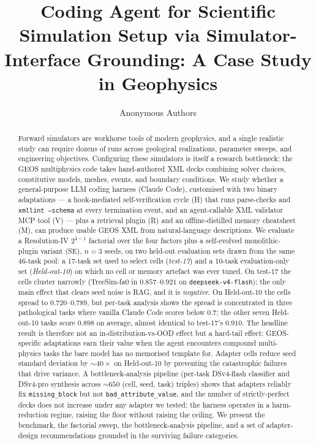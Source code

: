 \documentclass{article}
\title{Coding Agent for Scientific Simulation Setup via Simulator-Interface Grounding: A Case Study in Geophysics}
\author{%
  Anonymous Authors\\
}
\begin{document}
\maketitle


\begin{abstract}
Forward simulators are workhorse tools of modern geophysics, and a single realistic study can require dozens of runs across geological realizations, parameter sweeps, and engineering objectives. Configuring these simulators is itself a research bottleneck: the GEOS multiphysics code takes hand-authored XML decks combining solver choices, constitutive models, meshes, events, and boundary conditions. We study whether a general-purpose LLM coding harness (Claude Code), customised with two binary adaptations --- a hook-mediated self-verification cycle (H) that runs parse-checks and \texttt{xmllint --schema} at every termination event, and an agent-callable XML validator MCP tool (V) --- plus a retrieval plugin (R) and an offline-distilled memory cheatsheet (M), can produce usable GEOS XML from natural-language descriptions. We evaluate a Resolution-IV $2^{4-1}$ factorial over the four factors plus a self-evolved monolithic-plugin variant (SE), $n=3$ seeds, on two held-out evaluation sets drawn from the same 46-task pool: a 17-task set used to select cells (\emph{test-17}) and a 10-task evaluation-only set (\emph{Held-out-10}) on which no cell or memory artefact was ever tuned. On test-17 the cells cluster narrowly (TreeSim-fa0 in $0.857$--$0.921$ on \texttt{deepseek-v4-flash}); the only main effect that clears seed noise is RAG, and it is \emph{negative}. On Held-out-10 the cells spread to $0.720$--$0.789$, but per-task analysis shows the spread is concentrated in three pathological tasks where vanilla Claude Code scores below $0.7$; the other seven Held-out-10 tasks score $0.898$ on average, almost identical to test-17's $0.910$. The headline result is therefore not an in-distribution-vs-OOD effect but a hard-tail effect: GEOS-specific adaptations earn their value when the agent encounters compound multi-physics tasks the bare model has no memorised template for. Adapter cells reduce seed standard deviation by ${\sim}40{\times}$ on Held-out-10 by preventing the catastrophic failures that drive variance. A bottleneck-analysis pipeline (per-task DSv4-flash classifier and DSv4-pro synthesis across ${\sim}650$ (cell, seed, task) triples) shows that adapters reliably fix \texttt{missing\_block} but not \texttt{bad\_attribute\_value}, and the number of strictly-perfect decks does not increase under any adapter we tested: the harness operates in a harm-reduction regime, raising the floor without raising the ceiling. We present the benchmark, the factorial sweep, the bottleneck-analysis pipeline, and a set of adapter-design recommendations grounded in the surviving failure categories.
\end{abstract}
\end{document}

